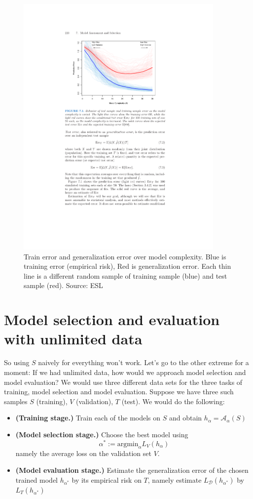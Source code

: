\documentclass[11pt]{article}
\newcommand{\Ac}{\mathcal{A}}
\newcommand{\Dc}{\mathcal{D}}
\begin{document}
\begin{figure}[H]
  \centering
  \includegraphics[width=4in]{train_vs_gen.pdf}
  \caption{Train error and generalization error over model complexity. Blue is
    training error (empirical risk), Red is generalization error. Each thin line
    is a different random sample of training sample (blue) and test sample
    (red).  Source: ESL}
\end{figure}

\section{Model selection and evaluation with unlimited data}

So using $S$ naively for everything won't work.
Let's go to the other extreme for a moment: 
If we had unlimited data, how would we approach model selection and model
evaluation? We would use three different data sets 
for the three tasks of training, model selection and model evaluation. 
Suppose we have three such samples $S$ (training), $V$ (validation), $T$ (test). 
We would do the following:
\begin{itemize}
  \item {\bf (Training stage.)} Train each of the models on $S$ and obtain $h_\alpha=\Ac_\alpha(S)$
  \item {\bf (Model selection stage.)} Choose the best model using 
    \[
      \alpha^* := \text{argmin}_\alpha L_V(h_\alpha)
    \]
    namely the average loss on the validation set $V$.
  \item {\bf (Model evaluation stage.)} 
    Estimate the generalization error of the chosen trained model $h_{\alpha^*}$
    by
    its empirical risk on $T$, namely estimate $L_\Dc(h_{\alpha^*})$ by
    $L_T(h_{\alpha^*})$
    
\end{itemize}
\end{document}
